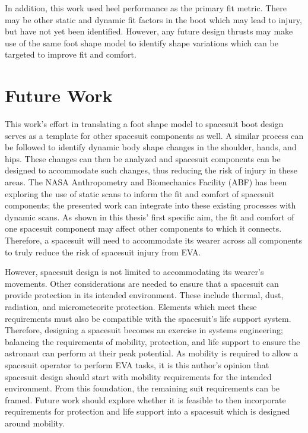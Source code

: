 \documentclass[defaultstyle,11pt]{thesis}
\begin{document}
In addition, this work used heel performance as the primary fit metric.
There may be other static and dynamic fit factors in the boot which may lead to injury, but have not yet been identified.
However, any future design thrusts may make use of the same foot shape model to identify shape variations which can be targeted to improve fit and comfort.

\hypertarget{future-work}{%
\section{Future Work}\label{future-work}}

This work's effort in translating a foot shape model to spacesuit boot design serves as a template for other spacesuit components as well.
A similar process can be followed to identify dynamic body shape changes in the shoulder, hands, and hips.
These changes can then be analyzed and spacesuit components can be designed to accommodate such changes, thus reducing the risk of injury in these areas.
The NASA Anthropometry and Biomechanics Facility (ABF) has been exploring the use of static scans to inform the fit and comfort of spacesuit components; the presented work can integrate into these existing processes with dynamic scans.
As shown in this thesis' first specific aim, the fit and comfort of one spacesuit component may affect other components to which it connects.
Therefore, a spacesuit will need to accommodate its wearer across all components to truly reduce the risk of spacesuit injury from EVA.

However, spacesuit design is not limited to accommodating its wearer's movements.
Other considerations are needed to ensure that a spacesuit can provide protection in its intended environment.
These include thermal, dust, radiation, and micrometeorite protection.
Elements which meet these requirements must also be compatible with the spacesuit's life support system.
Therefore, designing a spacesuit becomes an exercise in systems engineering; balancing the requirements of mobility, protection, and life support to ensure the astronaut can perform at their peak potential.
As mobility is required to allow a spacesuit operator to perform EVA tasks, it is this author's opinion that spacesuit design should start with mobility requirements for the intended environment.
From this foundation, the remaining suit requirements can be framed.
Future work should explore whether it is feasible to then incorporate requirements for protection and life support into a spacesuit which is designed around mobility.
\end{document}
